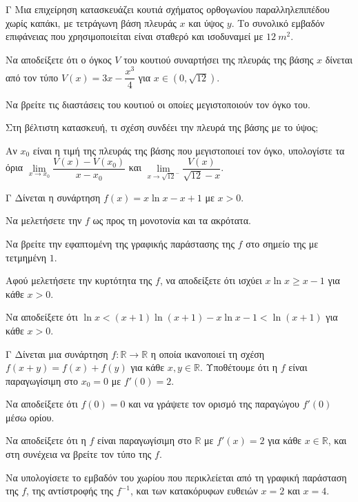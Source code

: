 \begin{thema}{Γ}
Μια επιχείρηση κατασκευάζει κουτιά σχήματος ορθογωνίου παραλληλεπιπέδου χωρίς καπάκι, με τετράγωνη βάση πλευράς $x$ και ύψος $y$. Το συνολικό εμβαδόν επιφάνειας που χρησιμοποιείται είναι σταθερό και ισοδυναμεί με $12\ \si{m^2}.$
\begin{erwthma}
  \item Να αποδείξετε ότι ο όγκος $V$ του κουτιού συναρτήσει της πλευράς της βάσης $x$ δίνεται από τον τύπο $V(x) = 3x - \dfrac{x^3}{4}$ για $x \in (0, \sqrt{12})$.
  \item Να βρείτε τις διαστάσεις του κουτιού οι οποίες μεγιστοποιούν τον όγκο του. 
  \item Στη βέλτιστη κατασκευή, τι σχέση συνδέει την πλευρά της βάσης με το ύψος;
  \item Αν $x_0$ είναι η τιμή της πλευράς της βάσης που μεγιστοποιεί τον όγκο, υπολογίστε τα όρια $\lim\limits_{x \to x_0} \dfrac{V(x) - V(x_0)}{x-x_0}$ και $\lim\limits_{x \to \sqrt{12}^-} \dfrac{V(x)}{\sqrt{12}-x}$.
\end{erwthma}
\end{thema}

\begin{thema}{Γ}
Δίνεται η συνάρτηση $f(x) = x \ln x - x + 1$ με $x > 0$.
\begin{erwthma}
  \item Να μελετήσετε την $f$ ως προς τη μονοτονία και τα ακρότατα.
  \item Να βρείτε την εφαπτομένη της γραφικής παράστασης της $f$ στο σημείο της με τετμημένη $1$.
  \item Αφού μελετήσετε την κυρτότητα της $f$, να αποδείξετε ότι ισχύει $x \ln x \ge x - 1$ για κάθε $x > 0$.
  \item  Να αποδείξετε ότι $\ln x < (x+1)\ln(x+1) - x\ln x - 1 < \ln(x+1)$ για κάθε $x > 0$.
\end{erwthma}
\end{thema}

\begin{thema}{Γ}
Δίνεται μια συνάρτηση $f: \mathbb{R} \to \mathbb{R}$ η οποία ικανοποιεί τη σχέση $f(x+y) = f(x) + f(y)$ για κάθε $x, y \in \mathbb{R}$. Υποθέτουμε ότι η $f$ είναι παραγωγίσιμη στο $x_0=0$ με $f'(0) = 2$.
\begin{erwthma}
  \item Να αποδείξετε ότι $f(0) = 0$ και να γράψετε τον ορισμό της παραγώγου $f'(0)$ μέσω ορίου.
  \item Να αποδείξετε ότι η $f$ είναι παραγωγίσιμη στο $\mathbb{R}$ με $f'(x) = 2$ για κάθε $x \in \mathbb{R}$, και στη συνέχεια να βρείτε τον τύπο της $f$.
  \item Να υπολογίσετε το εμβαδόν του χωρίου που περικλείεται από τη γραφική παράσταση της $f$, της αντίστροφής της $f^{-1}$, και των κατακόρυφων ευθειών $x=2$ και $x=4$.
\end{erwthma}
\end{thema}


